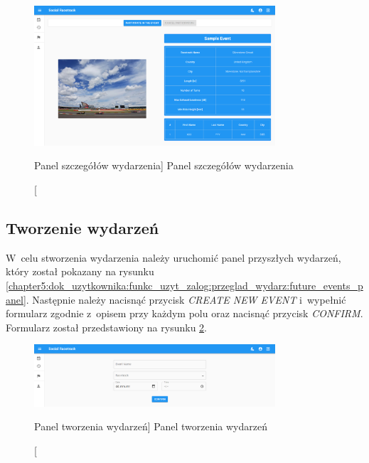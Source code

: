 \documentclass[../Kamil_Kowalewski_Main.tex]{subfiles}
\begin{document}
{{{            \begin{figure}[H]
                \centering
                \includegraphics[width=0.8\textwidth, keepaspectratio]
                {img/chapter5/loggedin/event_details.png}
                \caption
                [Panel szczegółów wydarzenia]
                {Panel szczegółów wydarzenia}
                \label{chapter5:dok_uzytkownika:funkc_uzyt_zalog:przeglad_wydarz:event_details}
            \end{figure}
        }

        \subsection{Tworzenie wydarzeń}
        \label{chapter5:dok_uzytkownika:funkc_uzyt_zalog:tworz_wydarz} {
            W~celu stworzenia wydarzenia należy uruchomić panel przyszłych wydarzeń,
            który został pokazany na rysunku
            \ref{chapter5:dok_uzytkownika:funkc_uzyt_zalog:przeglad_wydarz:future_events_panel}.
            Następnie należy nacisnąć przycisk \textit{CREATE NEW EVENT} i~wypełnić
            formularz zgodnie z~opisem przy każdym polu oraz nacisnąć przycisk
            \textit{CONFIRM}. Formularz został przedstawiony na rysunku
            \ref{chapter5:dok_uzytkownika:funkc_uzyt_zalog:tworz_wydarz:create_event}.

            \begin{figure}[H]
                \centering
                \includegraphics[width=0.8\textwidth, keepaspectratio]
                {img/chapter5/loggedin/create_event.png}
                \caption
                [Panel tworzenia wydarzeń]
                {Panel tworzenia wydarzeń}
                \label{chapter5:dok_uzytkownika:funkc_uzyt_zalog:tworz_wydarz:create_event}
            \end{figure}
        }

}}
\end{document}
